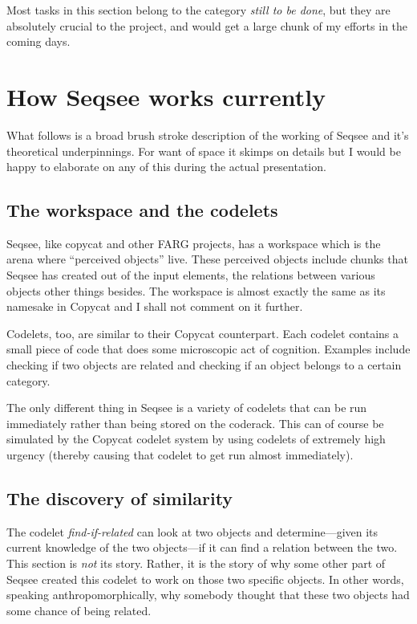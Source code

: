 \documentclass[letterpaper]{article}
\begin{document}
Most tasks in this section belong to the category \emph{still to be done}, but they are absolutely crucial to the project, and would get a large chunk of my efforts in the coming days.



\section{How Seqsee works currently}
\label{sec:how}

What follows is a broad brush stroke description of the working of Seqsee and it's theoretical underpinnings.  For want of space it skimps on details but I would be happy to elaborate on any of this during the actual presentation.

\subsection{The workspace and the codelets}

Seqsee, like copycat and other FARG projects, has a workspace which is the arena where ``perceived objects'' live.  These perceived objects include chunks that Seqsee has created out of the input elements, the relations between various objects other things besides.  The workspace is almost exactly the same as its namesake in Copycat and I shall not comment on it further.

Codelets, too, are similar to their Copycat counterpart. Each codelet contains a small piece of code that does some microscopic act of cognition.  Examples include checking if two objects are related and checking if an object belongs to a certain category.

The only different thing in Seqsee is a variety of codelets that can be run immediately rather than being stored on the coderack.  This can of course be simulated by the Copycat codelet system by using codelets of extremely high urgency (thereby causing that codelet to get run almost immediately).

\subsection{The discovery of similarity}

The codelet \emph{find-if-related} can look at two objects and determine---given its current knowledge of the two objects---if it can find a relation between the two.  This section is \emph{not} its story.  Rather, it is the story of why some other part of Seqsee created this codelet to work on those two specific objects.  In other words, speaking anthropomorphically, why somebody thought that these two objects had some chance of being related.
\end{document}
